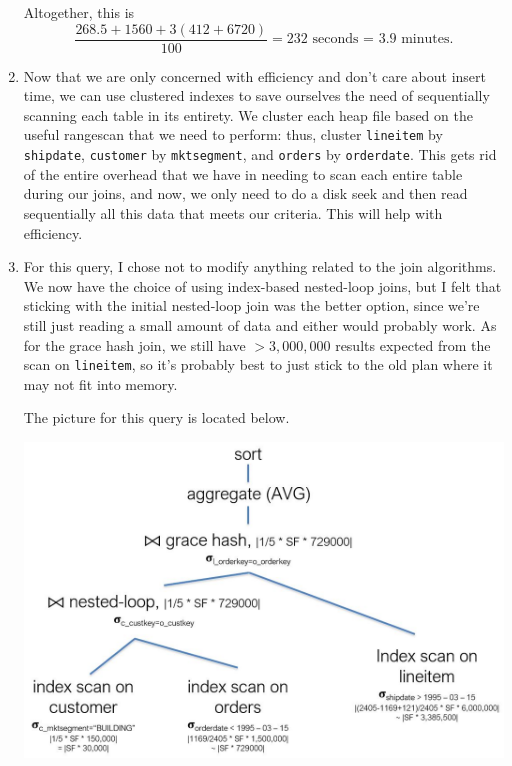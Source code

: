 \documentclass{article}
\begin{document}
\begin{enumerate}[resume]
	Altogether, this is \begin{equation*}
	\frac{268.5+1560+3(412+6720)}{100}=232 \text{ seconds = 3.9 minutes}.
	\end{equation*}

	\item Now that we are only concerned with efficiency and don't care about insert time, we can use clustered indexes to save ourselves the need of sequentially scanning each table in its entirety. We cluster each heap file based on the useful rangescan that we need to perform: thus, cluster \verb|lineitem| by \verb|shipdate|, \verb|customer| by \verb|mktsegment|, and \verb|orders| by \verb|orderdate|. This gets rid of the entire overhead that we have in needing to scan each entire table during our joins, and now, we only need to do a disk seek and then read sequentially all this data that meets our criteria. This will help with efficiency.

	\item For this query, I chose not to modify anything related to the join algorithms. We now have the choice of using index-based nested-loop joins, but I felt that sticking with the initial nested-loop join was the better option, since we're still just reading a small amount of data and either would probably work. As for the grace hash join, we still have $>3,000,000$ results expected from the scan on \verb|lineitem|, so it's probably best to just stick to the old plan where it may not fit into memory.

	The picture for this query is located below.

	\begin{center}
	\includegraphics[scale=0.5]{q16.JPG}
	\end{center}


\end{enumerate}
\end{document}
